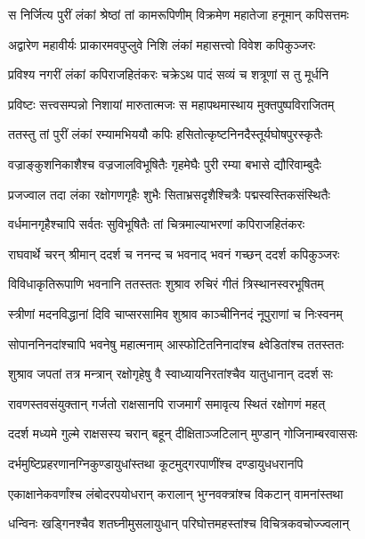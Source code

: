 
\twolineshloka
{स निर्जित्य पुरीं लंकां श्रेष्ठां तां कामरूपिणीम्}
{विक्रमेण महातेजा हनूमान् कपिसत्तमः} %

\twolineshloka
{अद्वारेण महावीर्यः प्राकारमवपुप्लुवे}
{निशि लंकां महासत्त्वो विवेश कपिकुञ्जरः} %

\twolineshloka
{प्रविश्य नगरीं लंकां कपिराजहितंकरः}
{चक्रेऽथ पादं सव्यं च शत्रूणां स तु मूर्धनि} %

\twolineshloka
{प्रविष्टः सत्त्वसम्पन्नो निशायां मारुतात्मजः}
{स महापथमास्थाय मुक्तपुष्पविराजितम्} %

\twolineshloka
{ततस्तु तां पुरीं लंकां रम्यामभिययौ कपिः}
{हसितोत्कृष्टनिनदैस्तूर्यघोषपुरस्कृतैः} %

\twolineshloka
{वज्राङ्कुशनिकाशैश्च वज्रजालविभूषितैः}
{गृहमेघैः पुरी रम्या बभासे द्यौरिवाम्बुदैः} %

\twolineshloka
{प्रजज्वाल तदा लंका रक्षोगणगृहैः शुभैः}
{सिताभ्रसदृशैश्चित्रैः पद्मस्वस्तिकसंस्थितैः} %

\twolineshloka
{वर्धमानगृहैश्चापि सर्वतः सुविभूषितैः}
{तां चित्रमाल्याभरणां कपिराजहितंकरः} %

\twolineshloka
{राघवार्थे चरन् श्रीमान् ददर्श च ननन्द च}
{भवनाद् भवनं गच्छन् ददर्श कपिकुञ्जरः} %

\twolineshloka
{विविधाकृतिरूपाणि भवनानि ततस्ततः}
{शुश्राव रुचिरं गीतं त्रिस्थानस्वरभूषितम्} %

\twolineshloka
{स्त्रीणां मदनविद्धानां दिवि चाप्सरसामिव}
{शुश्राव काञ्चीनिनदं नूपुराणां च निःस्वनम्} %

\twolineshloka
{सोपाननिनदांश्चापि भवनेषु महात्मनाम्}
{आस्फोटितनिनादांश्च क्ष्वेडितांश्च ततस्ततः} %

\twolineshloka
{शुश्राव जपतां तत्र मन्त्रान् रक्षोगृहेषु वै}
{स्वाध्यायनिरतांश्चैव यातुधानान् ददर्श सः} %

\twolineshloka
{रावणस्तवसंयुक्तान् गर्जतो राक्षसानपि}
{राजमार्गं समावृत्य स्थितं रक्षोगणं महत्} %

\twolineshloka
{ददर्श मध्यमे गुल्मे राक्षसस्य चरान् बहून्}
{दीक्षिताञ्जटिलान् मुण्डान् गोजिनाम्बरवाससः} %

\twolineshloka
{दर्भमुष्टिप्रहरणानग्निकुण्डायुधांस्तथा}
{कूटमुद्गरपाणींश्च दण्डायुधधरानपि} %

\twolineshloka
{एकाक्षानेकवर्णांश्च लंबोदरपयोधरान्}
{करालान् भुग्नवक्त्रांश्च विकटान् वामनांस्तथा} %

\twolineshloka
{धन्विनः खड्गिनश्चैव शतघ्नीमुसलायुधान्}
{परिघोत्तमहस्तांश्च विचित्रकवचोज्ज्वलान्} %

